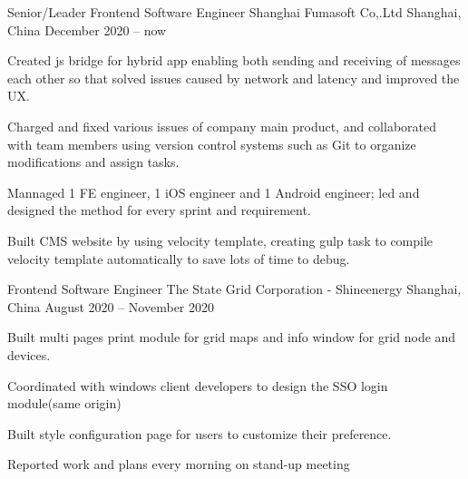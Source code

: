 
\begin{cventries}

  \cventry
    {Senior/Leader Frontend Software Engineer} %
    {Shanghai Fumasoft Co,.Ltd} %
    {Shanghai, China} %
    {December 2020 -- now} %
    {
      \begin{cvitems} %
        \item{Created js bridge for hybrid app enabling both sending and receiving of messages each other so that solved issues caused by network and latency and improved the UX. }
        \item{Charged and fixed various issues of company main product, and collaborated with team members using version control systems such as Git to organize modifications and assign tasks.}
        \item{Mannaged 1 FE engineer, 1 iOS engineer and 1 Android engineer; led and designed the method for every sprint and requirement.}
        \item{Built CMS website by using velocity template, creating gulp task to compile velocity template automatically to save lots of time to debug.}
      \end{cvitems}
    }
  

  \cventry
    {Frontend Software Engineer} %
    {The State Grid Corporation - Shineenergy } %
    {Shanghai, China} %
    {August 2020 -- November 2020} %
    {
      \begin{cvitems} %
        \item{Built multi pages print module for grid maps and info window for grid node and devices.}
        \item{Coordinated with windows client developers to design the SSO login module(same origin)}
        \item{Built style configuration page for users to customize their preference.}
        \item{Reported work and plans every morning on stand-up meeting}
      \end{cvitems}
    }


\end{cventries}
